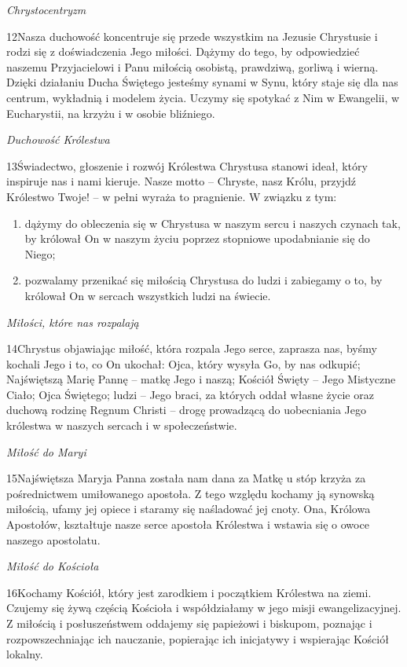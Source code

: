 ﻿\documentclass{book}
\newcommand{\lett}[1]{\lettrine[findent=6pt]{#1}}
\newcommand{\ssec}[1]{\vspace{1em}\textit{#1}\vspace{.5em}\nopagebreak}
\begin{document}
\ssec{Chrystocentryzm}
 
\lett{12} Nasza duchowość koncentruje się przede wszystkim na Jezusie Chrystusie i rodzi się z doświadczenia Jego miłości. Dążymy do tego, by odpowiedzieć naszemu Przyjacielowi i Panu miłością osobistą, prawdziwą, gorliwą i wierną. Dzięki działaniu Ducha Świętego jesteśmy synami w Synu, który staje się dla nas centrum, wykładnią i modelem życia. Uczymy się spotykać z Nim w Ewangelii, w Eucharystii, na krzyżu i w osobie bliźniego.
 
\ssec{Duchowość Królestwa}
 
\lett{13} {Ś}wiadectwo, głoszenie i rozwój Królestwa Chrystusa stanowi ideał, który inspiruje nas i nami kieruje. Nasze motto – Chryste, nasz Królu, przyjdź Królestwo Twoje! – w pełni wyraża to pragnienie. W związku z tym:


\begin{enumerate}


\item dążymy do obleczenia się w Chrystusa w naszym sercu i naszych czynach tak, by królował On w naszym życiu poprzez stopniowe upodabnianie się do Niego;


\item pozwalamy przenikać się miłością Chrystusa do ludzi i zabiegamy o to, by królował On w sercach wszystkich ludzi na świecie.


\end{enumerate}


\ssec{Miłości, które nas rozpalają}
 
\lett{14} Chrystus objawiając miłość, która rozpala Jego serce, zaprasza nas, byśmy kochali Jego i to, co On ukochał: Ojca, który wysyła Go, by nas odkupić; Najświętszą Marię Pannę – matkę Jego i naszą; Kościół Święty – Jego Mistyczne Ciało; Ojca Świętego; ludzi – Jego braci, za których oddał własne życie oraz duchową rodzinę Regnum Christi – drogę prowadzącą do uobecniania Jego królestwa w naszych sercach i w społeczeństwie.
 
\ssec{Miłość do Maryi}
 
\lett{15} Najświętsza Maryja Panna została nam dana za Matkę u stóp krzyża za pośrednictwem umiłowanego apostoła. Z tego względu kochamy ją synowską miłością, ufamy jej opiece i staramy się naśladować jej cnoty. Ona, Królowa Apostołów, kształtuje nasze serce apostoła Królestwa i wstawia się o owoce naszego apostolatu.
 
\ssec{Miłość do Kościoła}
 
\lett{16} Kochamy Kościół, który jest zarodkiem i początkiem Królestwa na ziemi. Czujemy się żywą częścią Kościoła i współdziałamy w jego misji ewangelizacyjnej. Z miłością i posłuszeństwem oddajemy się papieżowi i biskupom, poznając i rozpowszechniając ich nauczanie, popierając ich inicjatywy i wspierając Kościół lokalny.
\end{document}
